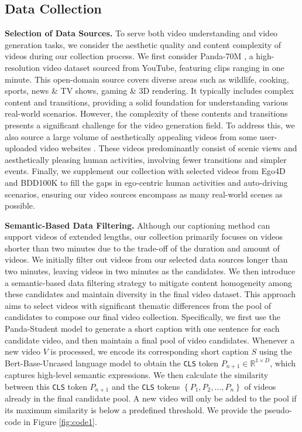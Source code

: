 \subsection{Data Collection}
\label{sec:data_source}
\textbf{Selection of Data Sources.} To serve both video understanding and video generation tasks, we consider the aesthetic quality and content complexity of videos during our collection process. We first consider Panda-70M \cite{chen2024panda}, a high-resolution video dataset sourced from YouTube, featuring clips ranging in one minute. This open-domain source covers diverse areas such as wildlife, cooking, sports, news \& TV shows, gaming \& 3D rendering. It typically includes complex content and transitions, providing a solid foundation for understanding various real-world scenarios. However, the complexity of these contents and transitions presents a significant challenge for the video generation field. To address this, we also source a large volume of aesthetically appealing videos from some user-uploaded video websites \cite{pexels,pixabay,mixkit}. These videos predominantly consist of scenic views and aesthetically pleasing human activities, involving fewer transitions and simpler events.
Finally, we supplement our collection with selected videos from Ego4D \cite{grauman2022ego4d} and BDD100K \cite{yu2020bdd100k} to fill the gaps in ego-centric human activities and auto-driving scenarios, ensuring our video sources encompass as many real-world scenes as possible. 

\textbf{Semantic-Based Data Filtering.} Although our captioning method can support videos of extended lengths, our collection primarily focuses on videos shorter than two minutes due to the trade-off of the duration and amount of videos. We initially filter out videos from our selected data sources longer than two minutes, leaving videos in two minutes as the candidates. We then introduce a semantic-based data filtering strategy to mitigate content homogeneity among these candidates and maintain diversity in the final video dataset. This approach aims to select videos with significant thematic differences from the pool of candidates to compose our final video collection.
Specifically, we first use the Panda-Student \cite{chen2024panda} model to generate a short caption with one sentence for each candidate video, and then maintain a final pool of video candidates. Whenever a new video $V$ is processed, we encode its corresponding short caption $S$ using the Bert-Base-Uncased \cite{devlin2018bert} language model to obtain the \texttt{CLS} token $P_{n+1} \in {\mathbb{R}^{1 \times D}}$, which captures high-level semantic expressions. We then calculate the similarity between this \texttt{CLS} token $P_{n+1}$ and the \texttt{CLS} tokens $\left\{ {{P_1},{P_2}, \ldots ,{P_n}} \right\}$ of videos already in the final candidate pool. A new video will only be added to the pool if its maximum similarity is below a predefined threshold. We provide the pseudo-code in Figure \ref{fig:code1}.

